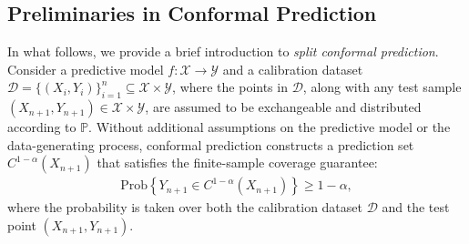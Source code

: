 \documentclass[11pt,a4paper]{article}
\begin{document}





\subsection{Preliminaries in Conformal Prediction}
\label{subsec:CP:preliminaries}

In what follows, we provide a brief introduction to \emph{split conformal prediction}. Consider a predictive model $f: \mathcal{X} \to \mathcal{Y}$ and a calibration dataset $\mathcal{D} = \{(X_i, Y_i)\}_{i=1}^n \subseteq \mathcal{X} \times \mathcal{Y}$, where the points in $\mathcal{D}$, along with any test sample $(X_{n+1}, Y_{n+1}) \in \mathcal{X} \times \mathcal{Y}$, are assumed to be exchangeable and distributed according to $\mathbb{P}$. Without additional assumptions on the predictive model or the data-generating process, conformal prediction constructs a prediction set $C^{1-\alpha}(X_{n+1})$ that satisfies the finite-sample coverage guarantee:
\begin{align}
\label{eq:basic:CP:guarantee}
    \text{Prob}\left\{Y_{n+1} \in C^{1-\alpha}(X_{n+1})\right\} \geq 1 - \alpha,
\end{align}
where the probability is taken over both the calibration dataset $\mathcal{D}$ and the test point $(X_{n+1}, Y_{n+1})$. 
\end{document}
